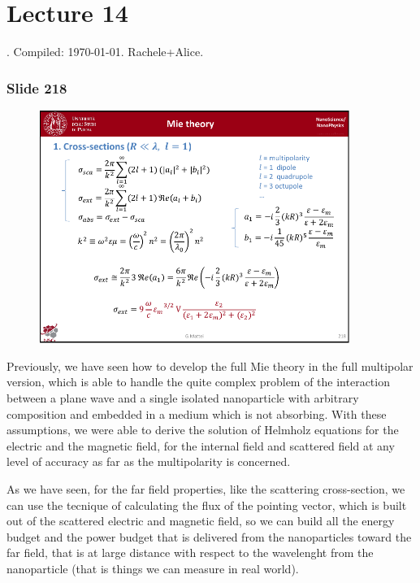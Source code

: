 \documentclass[../main/main.tex]{subfiles}
\begin{document}
\section{Lecture 14}
 . Compiled:  \today. Rachele+Alice.

\subsubsection{Slide 218}

\begin{figure}[h!]
\centering
\includegraphics[page=1,width=0.9\textwidth]{../lessons/pdf_file/14_lesson.pdf}
\end{figure}

Previously, we have seen how to develop the full Mie theory in the full multipolar version, which is able to handle the quite complex problem of the interaction between a plane wave and a single isolated nanoparticle with arbitrary composition and embedded in a medium which is not absorbing.
With these assumptions, we were able to derive the solution of Helmholz equations for the electric and the magnetic field, for the internal field and scattered field at any level of accuracy as far as the multipolarity is concerned.

As we have seen, for the far field properties, like the scattering cross-section, we can use the tecnique of calculating the flux of the pointing vector, which is built out of the scattered electric and magnetic field, so we can build all the energy budget and the power budget that is delivered from the nanoparticles toward the far field, that is at large distance with respect to the wavelenght from the nanoparticle (that is things we can measure in real world).
\end{document}
